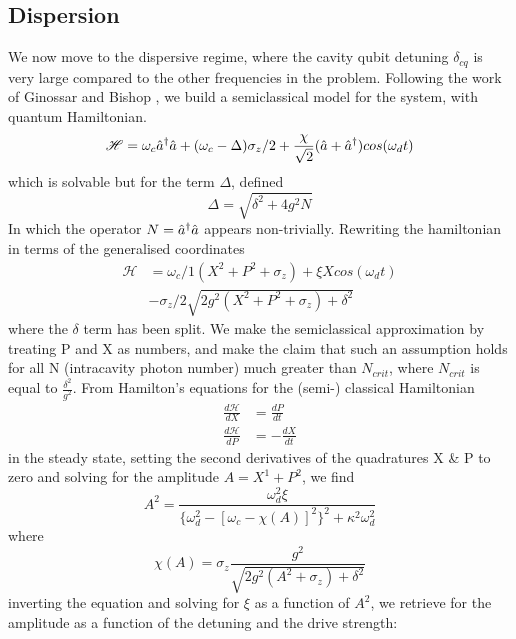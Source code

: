\subsection{Dispersion}
We now move to the dispersive regime, where the cavity qubit detuning $\delta_{cq}$ is very large compared to the other frequencies in the problem. Following the work of Ginossar and Bishop \cite{Bishop2010}, we build a semiclassical model for the system, with quantum Hamiltonian.
\begin{equation}
\mathscr{H} = \omega_c \hat{a}^\dagger \hat{a} + ( \omega_c - \Delta ) \sigma_z /2 + \frac{\chi}{\sqrt{2}} (\hat{a} + \hat{a}^\dagger ) cos(\omega_d t)
\end{equation}
which is solvable but for the term $\Delta$, defined
\begin{equation}
        \Delta = \sqrt{\delta^2 +4 g ^2 N}
\end{equation}
In which the operator $N = \hat{a}^\dagger \hat{a} $ appears non-trivially. Rewriting the hamiltonian in terms of the generalised coordinates
\begin{align}
        \mathscr{H} &= \omega_c/1 (X^2 + P^2 + \sigma_z) + \xi X cos(\omega_d t)\\
                    & - \sigma_z /2 \sqrt{2g^2(X^2+P^2+\sigma_z) + \delta^2}
\end{align}
where the $\delta$ term has been split. We make the semiclassical approximation by treating P and X as numbers, and make the claim that such an assumption holds for all N (intracavity photon number) much greater than $N_{crit}$, where $N_{crit}$ is equal to $\frac{\delta^2}{g^2}$.
From Hamilton's equations for the (semi-) classical Hamiltonian
\begin{align}
        \frac{d\mathscr{H}}{dX} &= \frac{dP}{dt}\\
        \frac{d\mathscr{H}}{dP} &= -\frac{dX}{dt}
\end{align}
in the steady state, setting the second derivatives of the quadratures X \& P to zero and solving for the amplitude $A = X^1 + P^2$, we find
\begin{equation}
        A^2 = \frac{\omega_d^2\xi}{\{\omega_d^2 - [\omega_c - \chi (A) ]^2 \}^2+ \kappa^2 \omega_d^2}
\end{equation}
where
\begin{equation}
        \chi(A) = \sigma_z \frac{g^2}{\sqrt{2g^2(A^2 + \sigma_z) + \delta^2}}
\end{equation}
inverting the equation and solving for $\xi$ as a function of $A^2$, we retrieve for the amplitude as a function of the detuning and the drive strength:
